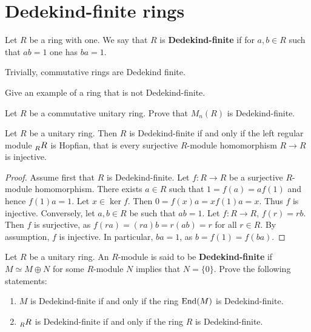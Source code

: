 
\section{Dedekind-finite rings}
\label{section:DedekindFinite}

\begin{definition}
    Let $R$ be a ring with one. We say that $R$ is \textbf{Dedekind-finite} if 
    for $a,b\in R$ such that $ab=1$ one has $ba=1$. 
\end{definition}

Trivially, commutative rings are Dedekind finite. 

\begin{exercise}
    Give an example of a ring that is not Dedekind-finite. 
\end{exercise}

\begin{exercise}
    Let $R$ be a commutative unitary ring. Prove that $M_n(R)$ is Dedekind-finite. 
\end{exercise}

\begin{proposition}
    Let $R$ be a unitary ring. Then $R$ is Dedekind-finite if and only if the left regular module 
    $\prescript{}{R}{R}$ is Hopfian, that is 
    every surjective $R$-module homomorphism $R\to R$ is injective.
\end{proposition}

\begin{proof}
    Assume first that $R$ is Dedekind-finite. Let $f\colon R\to R$ be a surjective $R$-module homomorphism. There exists $a \in R$ such that $1=f(a)=af(1)$ and hence $f(1)a=1$. Let $x\in\ker f$. Then $0=f(x)a=xf(1)a=x$. Thus $f$ is injective. Conversely, let $a,b\in R$ be such that $ab=1$. Let $f\colon R\to R$, $f(r)=rb$. Then $f$ is surjective, as $f(ra)=(ra)b=r(ab)=r$ for all $r \in R$. By assumption, $f$ is injective. In particular, $ba=1$, as $b=f(1)=f(ba)$. 
\end{proof}

\begin{exercise}
    Let $R$ be a unitary ring. An $R$-module is said to be \textbf{Dedekind-finite}
    if $M\simeq M\oplus N$ for some $R$-module $N$ implies that $N=\{0\}$. 
    Prove the following statements:
    \begin{enumerate}
        \item $M$ is Dedekind-finite if and only if the ring 
            $\operatorname{End}(M)$ is Dedekind-finite. 
        \item $\prescript{}{R}{R}$ is Dedekind-finite if and only if the ring $R$ is Dedekind-finite. 
    \end{enumerate}
\end{exercise}

